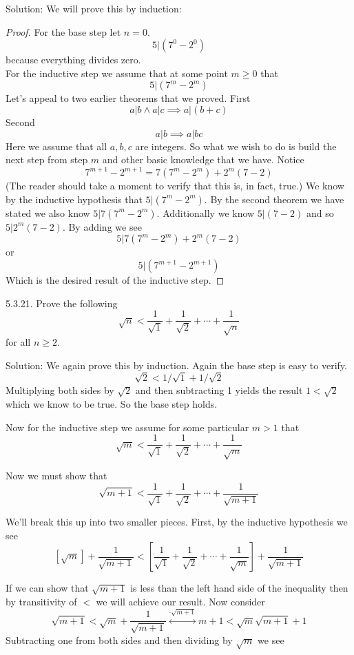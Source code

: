 \documentclass[16 pt]{amsart}
\theoremstyle{definition}
\theoremstyle{remark}
\numberwithin{equation}{subsection}
\begin{document}
Solution: We will prove this by induction:

\begin{proof}
For the base step let $n=0$.  
\[
5|(7^0-2^0)
\]
because everything divides zero.\\

For the inductive step we assume that at some point $m\geq 0$ that
\[
5|(7^m-2^m) 
\]
Let's appeal to two earlier theorems that we proved.  First
\[
a|b \wedge a|c \implies a|(b+c)
\]
Second
\[
a|b \implies a|bc
\]
Here we assume that all $a,b,c$ are integers.  So what we wish to do is build the next step from step $m$ and other basic knowledge that we have.  Notice
\[
7^{m+1} - 2^{m+1} = 7(7^m-2^m) + 2^m(7-2)
\]
(The reader should take a moment to verify that this is, in fact, true.)
We know by the inductive hypothesis that $5|(7^m-2^m)$.  By the second theorem we have stated we also know $5|7(7^m-2^m)$.  Additionally we know $5|(7-2)$ and so $5|2^m(7-2)$.  By adding we see
\[
5|7(7^m-2^m) + 2^m(7-2) 
\]
or
\[
5|(7^{m+1}-2^{m+1})
\]
Which is the desired result of the inductive step.
\end{proof}

\newpage


5.3.21. Prove the following
\[
\sqrt{n} < \frac{1}{\sqrt{1}} + \frac{1}{\sqrt{2}} + \cdots + \frac{1}{\sqrt{n}}
\]
for all $n\geq 2$.

\vspace{1in}

Solution: We again prove this by induction.  Again the base step is easy to verify.
\[
\sqrt{2} < 1/\sqrt{1}  + 1/\sqrt{2}
\]
Multiplying both sides by $\sqrt{2}$ and then subtracting 1 yields the result $1<\sqrt{2}$ which we know to be true.  So the base step holds.

Now for the inductive step we assume for some particular $m>1$ that
\[
\sqrt{m} < \frac{1}{\sqrt{1}} + \frac{1}{\sqrt{2}} + \cdots + \frac{1}{\sqrt{m}}
\]

Now we must show that
\[
\sqrt{m+1} < \frac{1}{\sqrt{1}} + \frac{1}{\sqrt{2}} + \cdots + \frac{1}{\sqrt{m+1}}
\]

We'll break this up into two smaller pieces.  First, by the inductive hypothesis we see
\[
[\sqrt{m}] + \frac{1}{\sqrt{m+1}} < \left[\frac{1}{\sqrt{1}} + \frac{1}{\sqrt{2}} + \cdots + \frac{1}{\sqrt{m}}\right] + \frac{1}{\sqrt{m+1}}
\]

If we can show that $\sqrt{m+1}$ is less than the left hand side of the inequality then by transitivity of $<$ we will achieve our result.  Now consider
\[
\sqrt{m+1} < \sqrt{m} + \frac{1}{\sqrt{m+1}} \overset{\cdot \sqrt{m+1}}{\longleftrightarrow} m+1 < \sqrt{m}\sqrt{m+1} +1
\]
Subtracting one from both sides and then dividing by $\sqrt{m}$
we see
\end{document}
